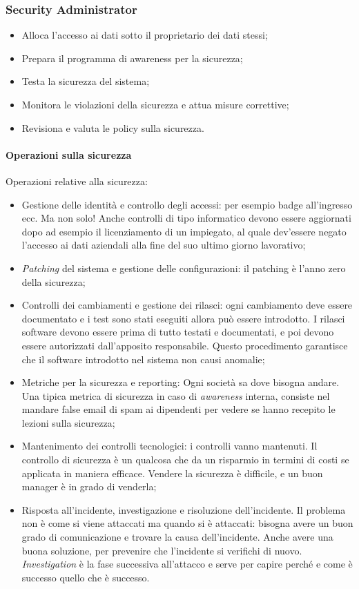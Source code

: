 \subsubsection{Security Administrator}

\begin{itemize}
\item Alloca l'accesso ai dati sotto il proprietario dei dati stessi;
\item Prepara il programma di awareness per la sicurezza;
\item Testa la sicurezza del sistema;
\item Monitora le violazioni della sicurezza e attua misure correttive;
\item Revisiona e valuta le policy sulla sicurezza.
\end{itemize}

\paragraph*{Operazioni sulla sicurezza}
\label{SA:SO}
Operazioni relative alla sicurezza:
\begin{itemize}
\item Gestione delle identità e controllo degli accessi: per esempio badge
all'ingresso ecc. Ma non solo! Anche controlli di tipo informatico devono
essere aggiornati dopo ad esempio il licenziamento di un impiegato, al quale
dev'essere negato l'accesso ai dati aziendali alla fine del suo ultimo giorno
lavorativo;
\item \textit{Patching} del sistema e gestione delle configurazioni: il
patching è l'anno zero della sicurezza;
\item Controlli dei cambiamenti e gestione dei rilasci: ogni cambiamento deve
essere documentato e i test sono stati eseguiti allora può essere introdotto.
I rilasci software devono essere prima di tutto testati e documentati, e poi
devono essere autorizzati dall'apposito responsabile. Questo procedimento
garantisce che il software introdotto nel sistema non causi anomalie;
\item Metriche per la sicurezza e reporting: Ogni società sa dove bisogna
andare. Una tipica metrica di sicurezza in caso di \emph{awareness} interna,
consiste nel mandare false email di spam ai dipendenti per vedere se
hanno recepito le lezioni sulla sicurezza;
\item Mantenimento dei controlli tecnologici: i controlli vanno mantenuti.
Il controllo di sicurezza è un qualcosa che da un risparmio in termini di costi
se applicata in maniera efficace. Vendere la sicurezza è difficile, e un buon
manager è in grado di venderla;

\item Risposta all'incidente, investigazione e risoluzione dell'incidente.
Il problema non è come si viene attaccati ma quando si è attaccati: bisogna
avere un buon grado di comunicazione e trovare la causa dell'incidente. Anche
avere una buona soluzione, per prevenire che l'incidente si verifichi di nuovo.
\textit{Investigation} è la fase successiva all'attacco e serve per capire
perché e come è successo quello che è successo.

\end{itemize}

